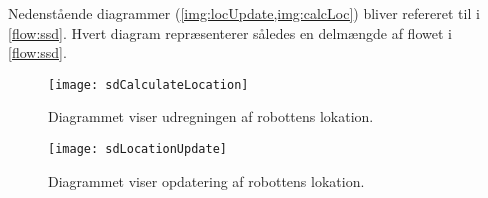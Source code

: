 Nedenstående diagrammer (\cref{img:locUpdate,img:calcLoc}) bliver refereret til i \cref{flow:ssd}.
Hvert diagram repræsenterer således en delmængde af flowet i \cref{flow:ssd}.

\begin{figure}[H]
\centering \texttt{[image: sdCalculateLocation]}
\caption{Diagrammet viser udregningen af robottens lokation.}
\label{img:calcLoc}
\end{figure}

\begin{figure}[H]
\centering \texttt{[image: sdLocationUpdate]}
\caption{Diagrammet viser opdatering af robottens lokation.}
\label{img:locUpdate}
\end{figure} 